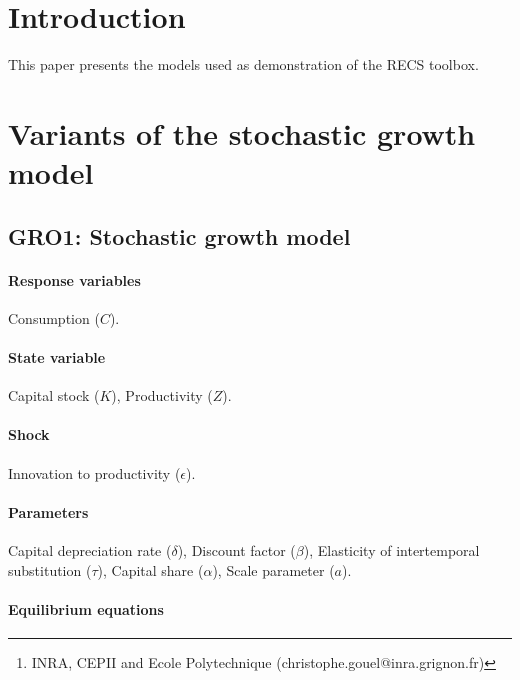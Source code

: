 \documentclass[11pt,fleqn]{article}
\title{}
\date{\today}%
\author{Christophe Gouel\footnote{INRA, CEPII and Ecole Polytechnique
    (christophe.gouel@inra.grignon.fr)}}
\begin{document}
\maketitle

\tableofcontents

\section{Introduction}
\label{sec:introduction}

This paper presents the models used as demonstration of the RECS toolbox.

\section{Variants of the stochastic growth model}
\label{sec:sto-grow}

\subsection{GRO1: Stochastic growth model}
\label{sec:gro1}

\paragraph{Response variables}

Consumption ($C$).

\paragraph{State variable}

Capital stock ($K$), Productivity ($Z$).

\paragraph{Shock}

Innovation to productivity ($\epsilon$).

\paragraph{Parameters}

Capital depreciation rate ($\delta$), Discount factor ($\beta$), Elasticity of
intertemporal substitution ($\tau$), Capital share ($\alpha$), Scale parameter
($a$).

\paragraph{Equilibrium equations}
\end{document}

